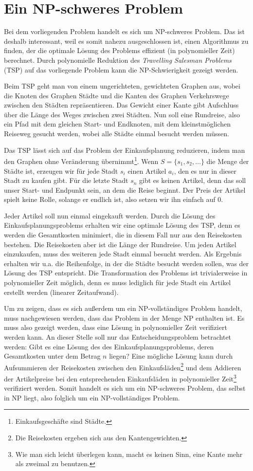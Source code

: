 \section{Ein NP-schweres Problem}
Bei dem vorliegenden Problem handelt es sich um NP-schweres Problem. Das ist deshalb interessant, weil es somit nahezu ausgeschlossen ist, einen Algorithmus zu finden, der die optimale Lösung des Problems effizient (in polynomieller Zeit) berechnet. Durch polynomielle Reduktion des \emph{Travelling Salesman Problems} (TSP) auf das vorliegende Problem kann die NP-Schwierigkeit gezeigt werden.

Beim TSP geht man von einem ungerichteten, gewichteten Graphen aus, wobei die Knoten des Graphen Städte und die Kanten des Graphen Verkehrswege zwischen den Städten repräsentieren. Das Gewicht einer Kante gibt Aufschluss über die Länge des Weges zwischen zwei Städten. Nun soll eine Rundreise, also ein Pfad mit dem gleichen Start- und Endknoten, mit dem kleinstmöglichen Reiseweg gesucht werden, wobei alle Städte einmal besucht werden müssen.

Das TSP lässt sich auf das Problem der Einkaufsplanung reduzieren, indem man den Graphen ohne Veränderung übernimmt\footnote{Einkaufsgeschäfte sind Städte.}. Wenn $S=\{s_1, s_2, \ldots\}$ die Menge der Städte ist, erzeugen wir für jede Stadt $s_i$ einen Artikel $a_i$, den es nur in dieser Stadt zu kaufen gibt. Für die letzte Stadt $s_n$ gibt es keinen Artikel, denn das soll unser Start- und Endpunkt sein, an dem die Reise beginnt. Der Preis der Artikel spielt keine Rolle, solange er endlich ist, also setzen wir ihn einfach auf $0$.

Jeder Artikel soll nun einmal eingekauft werden. Durch die Lösung des Einkaufsplanungsproblems erhalten wir eine optimale Lösung des TSP, denn es werden die Gesamtkosten minimiert, die in diesem Fall nur aus den Reisekosten bestehen. Die Reisekosten aber ist die Länge der Rundreise. Um jeden Artikel einzukaufen, muss des weiteren jede Stadt einmal besucht werden. Als Ergebnis erhalten wir u.a. die Reihenfolge, in der die Städte besucht werden sollen, was der Lösung des TSP entspricht. Die Transformation des Problems ist trivialerweise in polynomieller Zeit möglich, denn es muss lediglich für jede Stadt ein Artikel erstellt werden (linearer Zeitaufwand).

Um zu zeigen, dass es sich außerdem um ein NP-vollständiges Problem handelt, muss nachgewiesen werden, dass das Problem in der Menge NP enthalten ist. Es muss also gezeigt werden, dass eine Lösung in polynomieller Zeit verifiziert werden kann. An dieser Stelle soll nur das Entscheidungsproblem betrachtet werden: Gibt es eine Lösung des des Einkaufsplanungsproblems, deren Gesamtkosten unter dem Betrag $n$ liegen? Eine mögliche Lösung kann durch Aufsummieren der Reisekosten zwischen den Einkaufsläden\footnote{Die Reisekosten ergeben sich aus den Kantengewichten.} und dem Addieren der Artikelpreise bei den entsprechenden Einkaufsläden in polynomieller Zeit\footnote{Wie man sich leicht überlegen kann, macht es keinen Sinn, eine Kante mehr als zweimal zu benutzen.} verifiziert werden. Somit handelt es sich um ein NP-schweres Problem, das selbst in NP liegt, also folglich um ein NP-vollständiges Problem.
